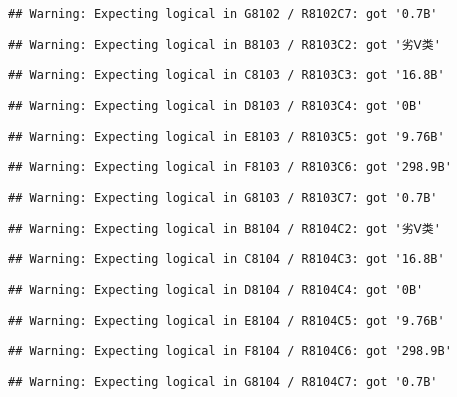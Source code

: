 \documentclass[
]{article}
\begin{document}
\begin{verbatim}
## Warning: Expecting logical in G8102 / R8102C7: got '0.7B'
\end{verbatim}

\begin{verbatim}
## Warning: Expecting logical in B8103 / R8103C2: got '劣Ⅴ类'
\end{verbatim}

\begin{verbatim}
## Warning: Expecting logical in C8103 / R8103C3: got '16.8B'
\end{verbatim}

\begin{verbatim}
## Warning: Expecting logical in D8103 / R8103C4: got '0B'
\end{verbatim}

\begin{verbatim}
## Warning: Expecting logical in E8103 / R8103C5: got '9.76B'
\end{verbatim}

\begin{verbatim}
## Warning: Expecting logical in F8103 / R8103C6: got '298.9B'
\end{verbatim}

\begin{verbatim}
## Warning: Expecting logical in G8103 / R8103C7: got '0.7B'
\end{verbatim}

\begin{verbatim}
## Warning: Expecting logical in B8104 / R8104C2: got '劣Ⅴ类'
\end{verbatim}

\begin{verbatim}
## Warning: Expecting logical in C8104 / R8104C3: got '16.8B'
\end{verbatim}

\begin{verbatim}
## Warning: Expecting logical in D8104 / R8104C4: got '0B'
\end{verbatim}

\begin{verbatim}
## Warning: Expecting logical in E8104 / R8104C5: got '9.76B'
\end{verbatim}

\begin{verbatim}
## Warning: Expecting logical in F8104 / R8104C6: got '298.9B'
\end{verbatim}

\begin{verbatim}
## Warning: Expecting logical in G8104 / R8104C7: got '0.7B'
\end{verbatim}
\end{document}
